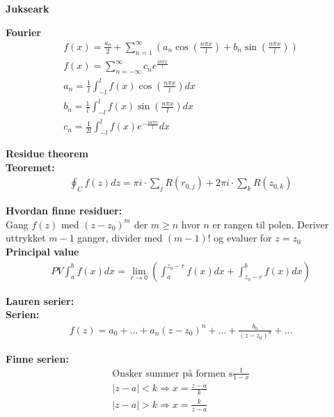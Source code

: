 \documentclass[8pt, A4paper, norsk]{extarticle}
\begin{document}
	\begin{center}
\Huge \textbf{Jukseark}
	\end{center}
	\begin{multicols*}{3}
{\Large \textbf{Fourier}}
		\begin{gather*}
f(x) = \frac{a_0}{2} + \sum_{n = 1}^{\infty} \left( a_n \cos\left( \frac{n \pi x}{l} \right) + b_n \sin\left( \frac{n \pi x}{l} \right) \right) \\
f(x) = \sum_{n = - \infty}^{\infty} c_n e^{\frac{i n\pi x}{l}} \\
a_n = \frac{1}{l} \int_{- l}^{l} f(x) \cos\left( \frac{n\pi x}{l} \right) dx \\
b_n = \frac{1}{l} \int_{- l}^{l} f(x) \sin\left( \frac{n\pi x}{l} \right) dx \\
c_n = \frac{1}{2 l} \int_{- l}^{l} f(x) e^{- \frac{i n\pi x}{l}} dx
		\end{gather*}


{\Large \textbf{Residue theorem}} \\
\textbf{Teoremet:}
		\begin{gather*}
\oint_C f(z) dz = \pi i \cdot \sum_{j} R(r_{0, j}) + 2 \pi i \cdot \sum_{k} R(z_{0, k})
		\end{gather*}

\textbf{Hvordan finne residuer:} \\
Gang $f(z)$ med $(z - z_0)^{m}$ der $m \geq n$ hvor $n$ er rangen til polen. Deriver uttrykket $m - 1$ ganger, divider med $(m - 1)!$ og evaluer for $z = z_0$ \\


{\Large \textbf{Principal value}}
		\begin{gather*}
PV \int_{a}^{b} f(x) dx = \lim_{r \rightarrow 0} \left( \int_{a}^{z_0 - r} f(x) dx + \int_{z_0 - r}^{b} f(x) dx \right)
		\end{gather*}


{\Large \textbf{Lauren serier:}} \\
\textbf{Serien:}
		\begin{gather*}
f(z) = a_0 + \dots + a_n(z - z_0)^{n} + \dots + \frac{b_n}{(z - z_0)^{n}} + \dots
		\end{gather*}

\textbf{Finne serien:}
		\begin{gather*}
\text{Ønsker summer på formen s} \frac{1}{1 - x} \\
|z - a| < k \Rightarrow x = \frac{z - a}{k} \\
|z - a| > k \Rightarrow x = \frac{k}{z - a}
		\end{gather*}



\end{multicols*}
\end{document}

